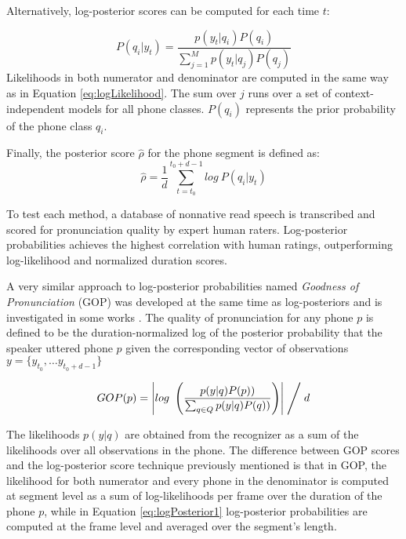 Alternatively, log-posterior scores can be computed for each time $t$:

\begin{equation}
\label{eq:logPosterior1}
P(q_{i}|y_{t}) = \frac{p(y_{t}|q_{i})P(q_{i})}{\sum\limits_{j=1}^{M} p(y_{t}|q_{j})P(q_{j})}
\end{equation}
Likelihoods in both numerator and denominator are computed in the same way as in
Equation \ref{eq:logLikelihood}.
The sum over $j$ runs over a set of context-independent models for all phone classes. $P(q_{i})$
represents the prior probability of the phone class $q_{i}$.

Finally, the posterior score $\hat{\rho}$ for the phone segment is defined as:
\begin{equation}
\label{eq:logPosterior2}
\hat{\rho} = \frac{1}{d}\sum_{t=t_{0}}^{t_{0}+d-1} log \ P(q_{i}|y_{t})
\end{equation}

To test each method, a database of nonnative read speech is transcribed and scored for
pronunciation quality by expert human raters. Log-posterior probabilities achieves the
highest correlation with human ratings, outperforming log-likelihood and normalized duration
scores.

A very similar approach to log-posterior probabilities named \textit{Goodness of Pronunciation}
(GOP) was developed at the same time as log-posteriors and
is investigated in some works \cite{gop_1, gop_2, gop_3}. The quality of
pronunciation for any phone $p$ is defined to be the duration-normalized log of the posterior
probability that the speaker uttered phone $p$ given the corresponding vector of observations
$y=\{y_{t_{0}}, \dotsc y_{t_{0}+d-1} \}$

\begin{equation}
\label{eq:gopScore}
GOP(p) = \left| log \ \left(\frac{p(y|q)P(p))}{\sum_{q \in Q}p(y|q)P(q))}\right) \right| \Biggm/ d
\end{equation}

The likelihoods $p(y|q)$ are obtained from the recognizer as a sum of the likelihoods over all
observations in the phone.
The difference between GOP scores and the log-posterior score technique previously mentioned
is that in GOP, the likelihood for both numerator and every phone in the denominator is
computed at segment level as a sum of log-likelihoods per frame over the
duration of the phone $p$, while in Equation \ref{eq:logPosterior1} log-posterior
probabilities are computed at the frame level and averaged over the segment's length.

